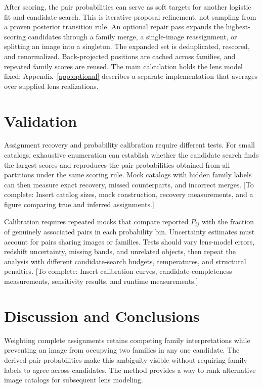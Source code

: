 \documentclass[twocolumn,twocolappendix,linenumbers]{aastex701}
\newcommand{\todo}[1]{\textcolor{red!65!black}{[To complete: #1]}}
\begin{document}
After scoring, the pair probabilities can serve as soft targets for another logistic fit and candidate search.
This is iterative proposal refinement, not sampling from a proven posterior transition rule.
An optional repair pass expands the highest-scoring candidates through a family merge, a single-image reassignment, or splitting an image into a singleton.
The expanded set is deduplicated, rescored, and renormalized.
Back-projected positions are cached across families, and repeated family scores are reused.
The main calculation holds the lens model fixed; Appendix~\ref{app:optional} describes a separate implementation that averages over supplied lens realizations.

\section{Validation}
\label{sec:validation}
Assignment recovery and probability calibration require different tests.
For small catalogs, exhaustive enumeration can establish whether the candidate search finds the largest scores and reproduces the pair probabilities obtained from all partitions under the same scoring rule.
Mock catalogs with hidden family labels can then measure exact recovery, missed counterparts, and incorrect merges.
\todo{Insert catalog sizes, mock construction, recovery measurements, and a figure comparing true and inferred assignments.}

Calibration requires repeated mocks that compare reported $P_{ij}$ with the fraction of genuinely associated pairs in each probability bin.
Uncertainty estimates must account for pairs sharing images or families.
Tests should vary lens-model errors, redshift uncertainty, missing bands, and unrelated objects, then repeat the analysis with different candidate-search budgets, temperatures, and structural penalties.
\todo{Insert calibration curves, candidate-completeness measurements, sensitivity results, and runtime measurements.}

\section{Discussion and Conclusions}
\label{sec:discussion}
Weighting complete assignments retains competing family interpretations while preventing an image from occupying two families in any one candidate.
The derived pair probabilities make this ambiguity visible without requiring family labels to agree across candidates.
The method provides a way to rank alternative image catalogs for subsequent lens modeling.
\end{document}
